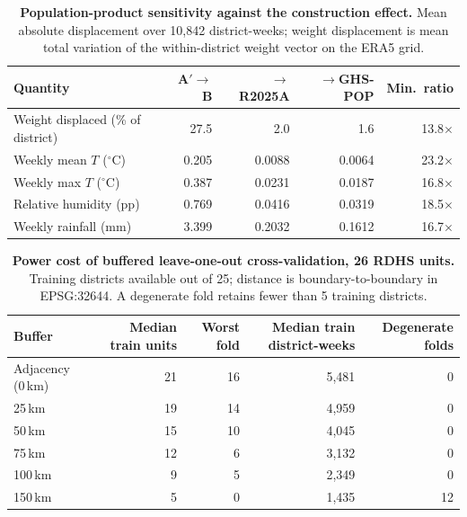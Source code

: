 \begin{table}[htbp]
\centering
\caption{\textbf{Population-product sensitivity against the construction effect.} Mean absolute displacement over 10{,}842 district-weeks; weight displacement is mean total variation of the within-district weight vector on the ERA5 grid.}
\label{tab:wp5-product}
\begin{tabular}{lrrrr}
\toprule
Quantity & A$'\to$ B & $\to$R2025A & $\to$GHS-POP & Min.\ ratio \\
\midrule
Weight displaced (\% of district) & 27.5  & 2.0    & 1.6    & 13.8$\times$ \\
Weekly mean $T$ ($^{\circ}$C)     & 0.205 & 0.0088 & 0.0064 & 23.2$\times$ \\
Weekly max $T$ ($^{\circ}$C)      & 0.387 & 0.0231 & 0.0187 & 16.8$\times$ \\
Relative humidity (pp)            & 0.769 & 0.0416 & 0.0319 & 18.5$\times$ \\
Weekly rainfall (mm)              & 3.399 & 0.2032 & 0.1612 & 16.7$\times$ \\
\bottomrule
\end{tabular}
\end{table}

\begin{table}[htbp]
\centering
\caption{\textbf{Power cost of buffered leave-one-out cross-validation, 26 RDHS units.} Training districts available out of 25; distance is boundary-to-boundary in EPSG:32644. A degenerate fold retains fewer than 5 training districts.}
\label{tab:wp4-power}
\begin{tabular}{lrrrr}
\toprule
Buffer & Median train units & Worst fold & Median train district-weeks & Degenerate folds \\
\midrule
Adjacency (0\,km) & 21 & 16 & 5{,}481 & 0 \\
25\,km            & 19 & 14 & 4{,}959 & 0 \\
50\,km            & 15 & 10 & 4{,}045 & 0 \\
75\,km            & 12 & 6  & 3{,}132 & 0 \\
100\,km           & 9  & 5  & 2{,}349 & 0 \\
150\,km           & 5  & 0  & 1{,}435 & 12 \\
\bottomrule
\end{tabular}
\end{table}

